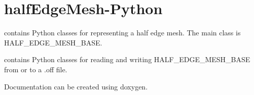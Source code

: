 \chapter{half\+Edge\+Mesh-\/\+Python}
\hypertarget{md__r_e_a_d_m_e}{}\label{md__r_e_a_d_m_e}
\label{md__r_e_a_d_m_e_autotoc_md0}%
%
  contains Python classes for representing a half edge mesh. The main class is HALF\+\_\+\+EDGE\+\_\+\+MESH\+\_\+\+BASE.

 contains Python classes for reading and writing HALF\+\_\+\+EDGE\+\_\+\+MESH\+\_\+\+BASE from or to a .off file.

Documentation can be created using doxygen. 